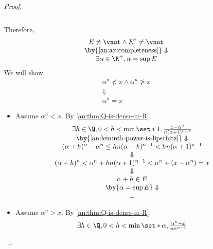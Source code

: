 \begin{proof}
\begin{itemize}
\[          \]
  \end{itemize}
  Therefore,
  \[
    \begin{array}{c}
      E \neq \vnot \land E^{\uparrow} \neq \vnot \\
      \by{\Cref{an:ax:completeness}} \Downarrow  \\
      \exists \alpha \in \R^{+}, \alpha = \sup E
    \end{array}
  \]
  We will show
  \[
    \begin{array}{c}
      \alpha^{n} \not< x \land \alpha^{n} \not> x \\
      \Downarrow                                  \\
      \alpha^{n} = x
    \end{array}
  \]
  \begin{itemize}
    \item Assume $\alpha^{n} < x$. By \cref{an:thm:Q-is-dense-in-R},
          \[
            \begin{array}{c}
              \exists h \in \Q, 0 < h < \min\set*{1, \frac{x - \alpha^{n}}{n(\alpha + 1)^{n - 1}}}       \\
              \by{\Cref{an:lem:nth-power-is-lipschitz}} \Downarrow                                       \\
              (\alpha + h)^{n} - \alpha^{n} \leq hn(\alpha + h)^{n - 1} < hn(\alpha + 1)^{n - 1}         \\
              \Downarrow                                                                                 \\
              (\alpha + h)^{n} < \alpha^{n} + hn(\alpha + 1)^{n - 1} < \alpha^{n} + (x - \alpha^{n}) = x \\
              \Downarrow                                                                                 \\
              \alpha + h \in E                                                                           \\
              \by{\ensuremath{\alpha = \sup E}} \Downarrow                                               \\
              \bot
            \end{array}
          \]
    \item Assume $\alpha^{n} > x$. By \cref{an:thm:Q-is-dense-in-R},
          \[
            \begin{array}{c}
              \exists h \in \Q, 0 < h < \min\set*{\alpha, \frac{\alpha^{n} - x}{n\alpha^{n - 1}}}     \\

\end{array}\]
\end{itemize}
\end{proof}
